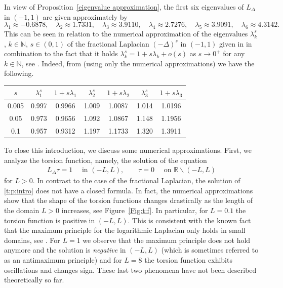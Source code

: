\documentclass[10 pt]{article}
\numberwithin{equation}{section}
\def\N{\mathbb{N}}
\def\R{\mathbb{R}}
\begin{document}
In view of Proposition~\ref{eigenvalue approximation}, the first six eigenvalues of $L_{\Delta}$ in $(-1,1)$ are given approximately by
\begin{equation*}
\lambda_1\approx -0.6878, \quad \lambda_2\approx 1.7331,\quad \lambda_3\approx 3.9110,\quad \lambda_4\approx 2.7276, \quad \lambda_5\approx 3.9091,\quad \lambda_6\approx 4.3142.
\end{equation*}
This can be seen in relation to the numerical approximation of the eigenvalues $\lambda_{k}^s$, $k\in\N$, $s\in(0,1)$ of the fractional Laplacian $(-\Delta)^s$ in $(-1,1)$ given in \cite{K12} in combination to the fact that it holds $\lambda_k^s=1+s\lambda_k+o(s)$ as $s\to 0^+$ for any $k\in\N$, see \cite{FJW22}. Indeed, from \cite[Table 1]{K12} (using only the numerical approximations) we have the following.
\begin{center}
\begin{tabular}{c|cc|cc|cc}
$s$ & $\lambda_1^s$ &$1+s\lambda_1$  & $\lambda_2^s$ &$1+s\lambda_2$ & $\lambda_3^s$ &$1+s\lambda_3$\\
\hline
0.005 & 0.997 & 0.9966 & 1.009 & 1.0087 & 1.014 & 1.0196\\
0.05  & 0.973 & 0.9656 & 1.092 & 1.0867 & 1.148 & 1.1956\\
0.1   & 0.957 & 0.9312 & 1.197 & 1.1733 & 1.320 & 1.3911
\end{tabular}
\end{center}

To close this introduction, we discuss some numerical approximations.  First, we analyze the torsion function, namely, the solution of the equation
\begin{align}\label{t:p:intro}
 L_\Delta \tau = 1\quad \text{ in }(-L,L),\qquad \tau=0\quad \text{ on }\R\backslash (-L,L)
\end{align}
for $L>0$.  In contrast to the case of the fractional Laplacian, the solution of \eqref{t:p:intro} does not have a closed formula. In fact, the numerical approximations show that the shape of the torsion functions changes drastically as the length of the domain $L>0$ increases, see Figure~\ref{Fig:t:f}. In particular, for $L=0.1$ the torsion function is positive in $(-L,L)$.  This is consistent with the known fact that the maximum principle for the logarithmic Laplacian only holds in small domains, see \cite[Corollary 1.9]{CW19}. For $L=1$ we observe that the maximum principle does not hold anymore and the solution is \emph{negative} in $(-L,L)$ (which is sometimes referred to as an antimaximum principle) and for $L=8$ the torsion function exhibits oscillations and changes sign. These last two phenomena have not been described theoretically so far.
\end{document}
